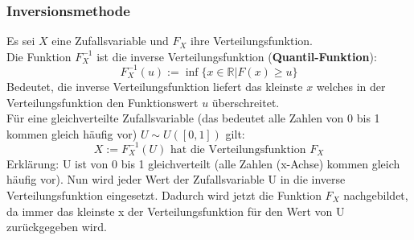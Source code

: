 \documentclass[12pt]{article}
\begin{document}
\subsubsection{Inversionsmethode}
Es sei $X$ eine Zufallsvariable und $F_X$ ihre Verteilungsfunktion.\\
Die Funktion $F_X^{-1}$ ist die inverse Verteilungsfunktion (\textbf{Quantil-Funktion}):
\begin{equation*}
	F_X^{-1}(u):= \inf\{x\in\mathbb{R}|F(x)\geq u\}
\end{equation*}
Bedeutet, die inverse Verteilungsfunktion liefert das kleinste $x$ welches in der Verteilungsfunktion den Funktionswert $u$ überschreitet.\\
Für eine gleichverteilte Zufallsvariable (das bedeutet alle Zahlen von 0 bis 1 kommen gleich häufig vor) $U\sim U([0,1])$ gilt:
\begin{equation*}
	X:=F_X^{-1}(U) \text{ hat die Verteilungsfunktion } F_X
\end{equation*}
Erklärung: U ist von 0 bis 1 gleichverteilt (alle Zahlen (x-Achse) kommen gleich häufig vor). Nun wird jeder Wert der Zufallsvariable U in die inverse Verteilungsfunktion eingesetzt. Dadurch wird jetzt die Funktion $F_X$ nachgebildet, da immer das kleinste x der Verteilungsfunktion für den Wert von U zurückgegeben wird.
\end{document}
